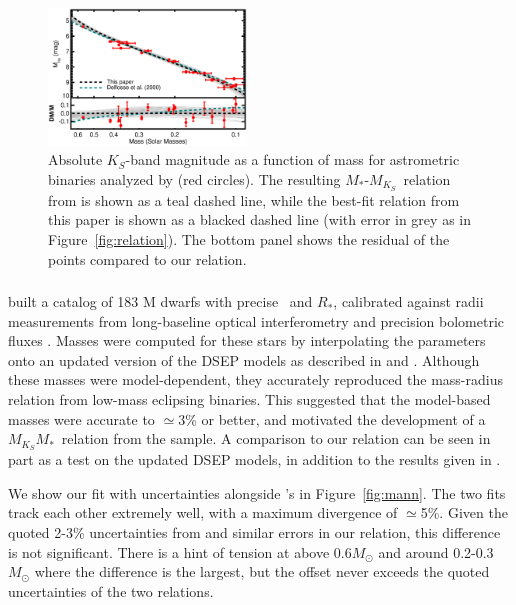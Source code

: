 \documentclass[twocolumn]{aastex62}
\newcommand{\mks}{$M_{K_S}$}
\newcommand{\mmk}{$M_{K_S}$\textendash$M_*$}
\begin{document}
\begin{figure}[htb]
\begin{center}
\includegraphics[width=0.47\textwidth]{Delfosse_comp.eps}
\caption{Absolute $K_S$-band magnitude as a function of mass for astrometric binaries analyzed by \citet{Delfosse2000} (red circles). The resulting $M_*$-\mks\ relation from \citet{Delfosse2000} is shown as a teal dashed line, while the best-fit relation from this paper is shown as a blacked dashed line (with error in grey as in Figure~\ref{fig:relation}). The bottom panel shows the residual of the \citet{Delfosse2000} points compared to our relation.}
\label{fig:delfosse}
\end{center}
\end{figure}

\subsubsection{\citet{Mann2015b}}

\citet{Mann2015b} built a catalog of 183 M dwarfs with precise \teff\ and $R_*$, calibrated against radii measurements from long-baseline optical interferometry \citep{Boyajian2012} and precision bolometric fluxes \citep[e.g.,][]{Mann2015a, 2015MNRAS.447..846B}. Masses were computed for these stars by interpolating the parameters onto an updated version of the DSEP models as described in \citet{Feiden2013,Feiden2014} and \citet{Muirhead2014}. Although these masses were model-dependent, they accurately reproduced the mass-radius relation from low-mass eclipsing binaries. This suggested that the model-based masses were accurate to $\simeq$3\% or better, and motivated the development of a \mmk\ relation from the \citet{Mann2015b} sample. A comparison to our relation can be seen in part as a test on the updated DSEP models, in addition to the results given in \citet{Mann2015b}. 

We show our fit with uncertainties alongside \citet{Mann2015b}'s in Figure~\ref{fig:mann}. The two fits track each other extremely well, with a maximum divergence of $\simeq$5\%. Given the quoted 2-3\% uncertainties from \citet{Mann2015b} and similar errors in our relation, this difference is not significant. There is a hint of tension at above 0.6$M_\odot$ and around 0.2-0.3$M_\odot$ where the difference is the largest, but the offset never exceeds the quoted uncertainties of the two relations.  
\end{document}
